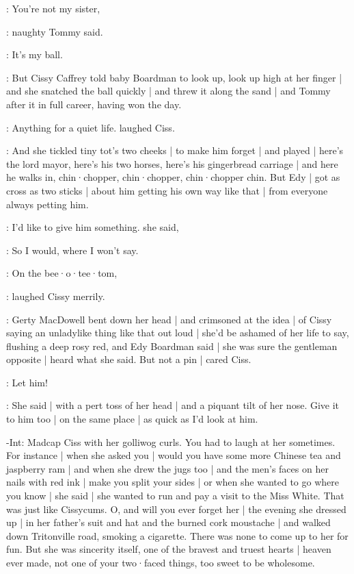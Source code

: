 \tommy:
You're not my sister,

:
naughty Tommy said.

\tommy:
It's my ball.

:
But Cissy Caffrey told baby Boardman to look up,
look up high at her finger |
and she snatched the ball quickly |
and threw it along the sand |
and Tommy after it in full career,
having won the day.

\cissy:
Anything for a quiet life.
laughed Ciss.

:
And she tickled tiny tot's two cheeks |
to make him forget |
and played |
here's the lord mayor,
here's his two horses,
here's his gingerbread carriage |
and here he walks in,
chin·chopper,
chin·chopper,
chin·chopper chin.
But Edy |
got as cross as two sticks |%
about him getting his own way like that |
from everyone always petting him.

\edy:
I'd like to give him something.
she said,

\edy:
So I would,
where I won't say.

\cissy:
On the bee·o·tee·tom,

:
laughed Cissy merrily.

:
Gerty MacDowell bent down her head |
and crimsoned at the idea |
of Cissy saying an unladylike thing like that out loud |
she'd be ashamed of her life to say,
flushing a deep rosy red,
and Edy Boardman said |
she was sure the gentleman opposite |
heard what she said.
But not a pin |
cared Ciss.

\cissy:
Let him!

:
She said |
with a pert toss of her head |
and a piquant tilt of her nose.
Give it to him too |
on the same place |
as quick as I'd look at him.

\gerty-Int:
Madcap Ciss with her golliwog curls.%
You had to laugh at her sometimes.
For instance |
when she asked you |
would you have some more Chinese tea and jaspberry ram |
and when she drew the jugs too |
and the men's faces on her nails with red ink |
make you split your sides |
or when she wanted to go where you know |
she said |
she wanted to run and pay a visit to the Miss White.
That was just like Cissycums.
O,
and will you ever forget her |
the evening she dressed up |
in her father's suit and hat and the burned cork moustache |
and walked down Tritonville road,
smoking a cigarette.
There was none to come up to her for fun.
But she was sincerity itself,
one of the bravest and truest hearts |
heaven ever made,
not one of your two·faced things,%
too sweet to be wholesome.

